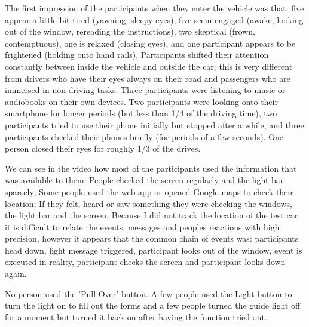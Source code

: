 The first impression of the participants when they enter the vehicle was that: five appear a little bit tired (yawning, sleepy eyes), five seem engaged (awake, looking out of the window, rereading the instructions), two skeptical (frown, contemptuous), one is relaxed (closing eyes), and one participant appears to be frightened (holding onto hand rails). Participants shifted their attention constantly between inside the vehicle and outside the car; this is very different from drivers who have their eyes always on their road and passengers who are immersed in non-driving tasks. 
Three participants were listening to music or audiobooks on their own devices. Two participants were looking onto their smartphone for longer periods (but less than 1/4 of the driving time), two participants tried to use their phone initially but stopped after a while, and three participants checked their phones briefly (for periods of a few seconds). One person closed their eyes for roughly 1/3 of the drives. 

We can see in the video how most of the participants used the information that was available to them: People checked the screen regularly and the light bar sparsely; Some people used the web app or opened Google maps to check their location; If they felt, heard or saw something they were checking the windows, the light bar and the screen. Because I did not track the location of the test car it is difficult to relate the events, messages and peoples reactions with high precision, however it appears that the common chain of events was: participants head down, light message triggered, participant looks out of the window, event is executed in reality, participant checks the screen and participant looks down again. 

No person used the 'Pull Over' button. A few people used the Light button to turn the light on to fill out the forms and a few people turned the guide light off for a moment but turned it back on after having the function tried out. 

